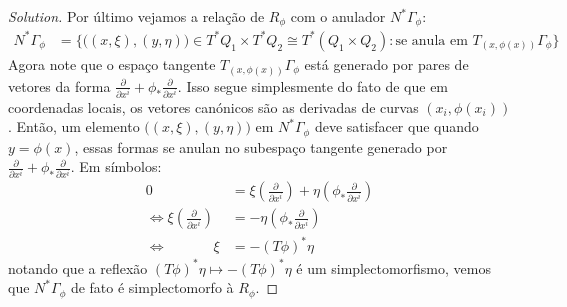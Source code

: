 \begin{proof}[Solution]
Por último vejamos a rela\c c\~ao de $R_\phi$ com o anulador $N^* \Gamma_\phi$:
\begin{align*}
	N^*\Gamma_\phi&=\{\big((x,\xi),(y,\eta)\big)\in T^*Q_1\times T^*Q_2\cong T^*(Q_1\times Q_2):\text{se anula em }T_{(x,\phi(x))}\Gamma_\phi \}
\end{align*}
Agora note que o espaço tangente $T_{(x,\phi(x))}\Gamma_\phi$ está generado por pares de vetores da forma $\frac{\partial }{\partial x^i}+\phi_*\frac{\partial }{\partial x^i}$. Isso segue simplesmente do fato de que em coordenadas locais, os vetores can\'onicos s\~ao as derivadas de curvas $(x_i,\phi(x_i))$. Ent\~ao, um elemento $\big((x,\xi ),(y,\eta)\big)$ em $N^*\Gamma_\phi$ deve satisfacer que quando $y=\phi(x)$, essas formas se anulan no subespaço tangente generado por  $\frac{\partial }{\partial x^i}+\phi_*\frac{\partial }{\partial x^i}$. Em s\'imbolos:
\begin{align*}
	0&=\xi \left( \frac{\partial }{\partial x^i} \right) +\eta\left( \phi_*\frac{\partial }{\partial x^i } \right) \\
\iff	\xi \left( \frac{\partial }{\partial x^i} \right) &=-\eta\left( \phi_*\frac{\partial }{\partial x^i} \right) \\
\iff\qquad\; \quad 	\xi &=-(T\phi)^*\eta
\end{align*}
notando que a reflex\~ao $(T \phi)^*\eta\mapsto -(T\phi)^*\eta$ \'e um simplectomorfismo, vemos que $N^*\Gamma_\phi$ de fato \'e simplectomorfo à $R_\phi$.
\end{proof}
\iffalse
\addcontentsline{toc}{subsection}{Problem 5}
\paragraph{Problem 5} Let $M$ be a manifold and $\omega\in\Omega^{k}(M)$. Suppose that $\pi:M\to B$ is a surjective submersion with connected fibers. We say that $\omega$ is \textit{\textbf{basic}} (with respect to $\pi$) if there exists a form $\overline{\omega} \in \Omega^{k}(B)$ such that $\pi^*\overline{\omega} =\omega$.
\begin{enumerate}[label=\alph*.]
	\item Show that $\omega$ is basic iff $i_X\omega=0$ and $\mathcal{L}_{X}\omega=0$ for all vector fields $X$ tangent to the fibers of $\pi$. In particular, if $\omega$ is closed, show that it is basic if $\ker(T\pi)\subseteq\ker \omega$ (pointwise in $M$ ).

		\item Suppose that $\omega$ is a closed 2-form on $M$ and $\ker(T\pi)=\ker \omega$. Show that $\omega=\pi^*\overline{\omega}$ and $\overline{\omega}\in\Omega^{2}(B)$ is symplectic.

		\item 
\end{enumerate}
\fi

